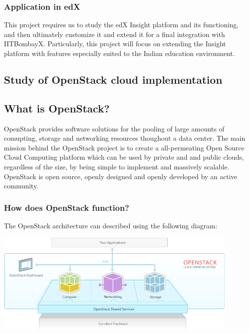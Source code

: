 \documentclass[14pt]{article}
\begin{document}
\subsubsection{Application in edX}

This project requires us to study the edX Insight platform and its functioning, and then ultimately customize it and extend it for a final integration with IITBombayX. Particularly, this project will focus on extending the Insight platform with features especially suited to the Indian education environment.

\subsection{Study of OpenStack cloud implementation}

\subsection{What is OpenStack?}

OpenStack \cite{Openstack} provides software solutions for the pooling of large amounts of comupting, storage and networking resources thoughout a data center. The main mission behind the OpenStack project is to create a all-permeating Open Source Cloud Computing platform which can be used by private and and public clouds, regardless of the size, by being simple to implement and massively scalable. OpenStack is open source, openly designed and openly developed by an active community.

\subsubsection{How does OpenStack function?}

The OpenStack architecture can described using the following diagram:

 \includegraphics[width=12cm]{./openstack-software-diagram.png}
\end{document}
